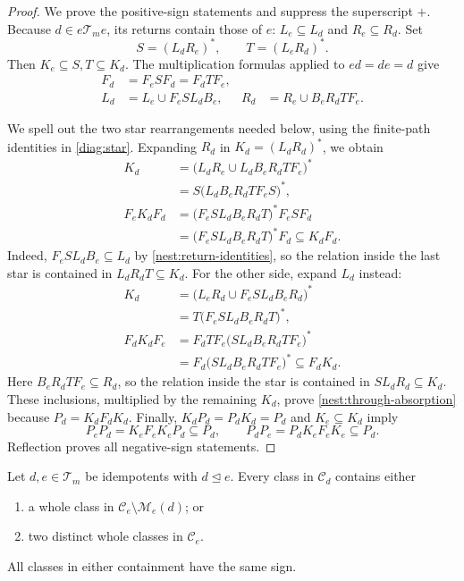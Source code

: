 \begin{proof}
We prove the positive-sign statements and suppress the superscript $+$.
Because $d\in e\mathcal T_m e$, its returns contain those of $e$:
$L_e\subseteq L_d$ and $R_e\subseteq R_d$.
Set
\[
 S=(L_dR_e)^*,\qquad T=(L_eR_d)^*.
\]
Then $K_e\subseteq S,T\subseteq K_d$.
The multiplication formulas applied to $ed=de=d$ give
\begin{align}
 F_d&=F_eSF_d=F_dTF_e,\label{nest:forward-identities}\\
 L_d&=L_e\cup F_eSL_dB_e,
 &R_d&=R_e\cup B_eR_dTF_e.
 \label{nest:return-identities}
\end{align}

We spell out the two star rearrangements needed below, using the
finite-path identities in \eqref{diag:star}.
Expanding $R_d$ in $K_d=(L_dR_d)^*$, we obtain
\begin{align*}
 K_d
 &=\bigl(L_dR_e\cup L_dB_eR_dTF_e\bigr)^*\\
 &=S\bigl(L_dB_eR_dTF_eS\bigr)^*,\\
 F_eK_dF_d
 &=\bigl(F_eSL_dB_eR_dT\bigr)^*F_eSF_d\\
 &=\bigl(F_eSL_dB_eR_dT\bigr)^*F_d
 \subseteq K_dF_d.
\end{align*}
Indeed, $F_eSL_dB_e\subseteq L_d$ by
\eqref{nest:return-identities}, so the relation inside the last star
is contained in $L_dR_dT\subseteq K_d$.
For the other side, expand $L_d$ instead:
\begin{align*}
 K_d
 &=\bigl(L_eR_d\cup F_eSL_dB_eR_d\bigr)^*\\
 &=T\bigl(F_eSL_dB_eR_dT\bigr)^*,\\
 F_dK_dF_e
 &=F_dTF_e\bigl(SL_dB_eR_dTF_e\bigr)^*\\
 &=F_d\bigl(SL_dB_eR_dTF_e\bigr)^*
 \subseteq F_dK_d.
\end{align*}
Here $B_eR_dTF_e\subseteq R_d$, so the relation inside the star
is contained in $SL_dR_d\subseteq K_d$.
These inclusions, multiplied by the remaining $K_d$, prove
\eqref{nest:through-absorption} because $P_d=K_dF_dK_d$.
Finally, $K_dP_d=P_dK_d=P_d$ and $K_e\subseteq K_d$ imply
\[
 P_eP_d=K_eF_eK_eP_d\subseteq P_d,
 \qquad P_dP_e=P_dK_eF_eK_e\subseteq P_d.
\]
Reflection proves all negative-sign statements.
\end{proof}

\begin{lemma}
\label{nest:containment}
Let $d,e\in\mathcal T_m$ be idempotents with $d\trianglelefteq e$.
Every class in $\mathcal C_d$ contains either
\begin{enumerate}
 \item a whole class in $\mathcal C_e\setminus\mathcal M_e(d)$; or
 \item two distinct whole classes in $\mathcal C_e$.
\end{enumerate}
All classes in either containment have the same sign.
\end{lemma}

